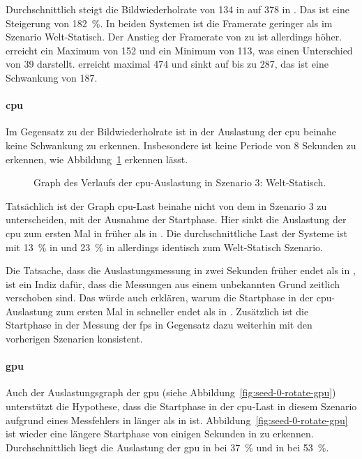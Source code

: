 Durchschnittlich steigt die Bildwiederholrate von \SI{134}{\fps} in \sysA{} auf \SI{378}{\fps} in \sysB{}. Das ist eine Steigerung von \SI{182}{\percent}. In beiden Systemen ist die Framerate geringer als im Szenario Welt-Statisch. Der Anstieg der Framerate von \sysA{} zu \sysB{} ist allerdings höher. \sysA{} erreicht ein Maximum von \SI{152}{\fps} und ein Minimum von \SI{113}{\fps}, was einen Unterschied von \SI{39}{\fps} darstellt. \sysB{} erreicht maximal \SI{474}{\fps} und sinkt auf bis zu \SI{287}{\fps}, das ist eine Schwankung von \SI{187}{\fps}.

\paragraph{\ac{cpu}}
Im Gegensatz zu der Bildwiederholrate ist in der Auslastung der \ac{cpu} beinahe keine Schwankung zu erkennen. Insbesondere ist keine Periode von 8 Sekunden zu erkennen, wie Abbildung~\ref{fig:seed-0-rotate-cpu} erkennen lässt.
\begin{figure}[!htbp]
	\caption[Graph des Verlaufs der -Auslastung in Szenario 4: Welt-Rotation.]{Graph des Verlaufs der \ac{cpu}-Auslastung in Szenario 3: Welt-Statisch.}\label{fig:seed-0-rotate-cpu}
\end{figure}
Tatsächlich ist der Graph \ac{cpu}-Last beinahe nicht von dem in Szenario 3 zu unterscheiden, mit der Ausnahme der Startphase. Hier sinkt die Auslastung der \ac{cpu} zum ersten Mal in \sysB{} früher als in \sysA{}. Die durchschnittliche Last der Systeme  ist mit \SI{13}{\percent} in \sysA{} und \SI{23}{\percent} in \sysB{} allerdings identisch zum Welt-Statisch Szenario.

Die Tatsache, dass die Auslastungsmessung in \sysB{} zwei Sekunden früher endet als in \sysA{}, ist ein Indiz dafür, dass die Messungen aus einem unbekannten Grund zeitlich verschoben sind. Das würde auch erklären, warum die Startphase in der \ac{cpu}-Auslastung zum ersten Mal in \sysB{} schneller endet als in \sysA{}. Zusätzlich ist die Startphase in der Messung der \ac{fps} in Gegensatz dazu weiterhin mit den vorherigen Szenarien konsistent. 

\paragraph{\ac{gpu}}
Auch der Auslastungsgraph der \ac{gpu} (siehe Abbildung~\ref{fig:seed-0-rotate-gpu}) unterstützt die Hypothese, dass die Startphase in der \ac{cpu}-Last in diesem Szenario aufgrund eines Messfehlers in \sysA{} länger als in \sysB{} ist. Abbildung~\ref{fig:seed-0-rotate-gpu} ist wieder eine längere Startphase von einigen Sekunden in \sysB{} zu erkennen. Durchschnittlich liegt die Auslastung der \ac{gpu} in \sysA{} bei \SI{37}{\percent} und in \sysB{} bei \SI{53}{\percent}. 

